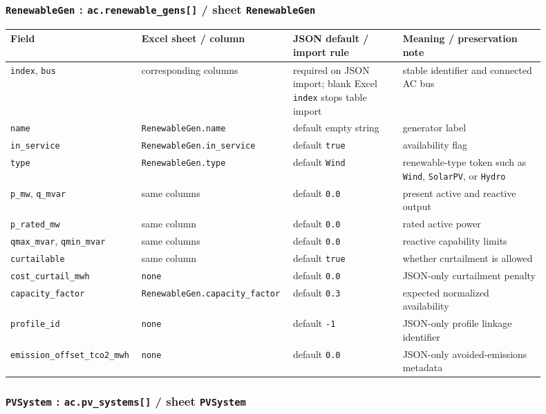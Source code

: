 \subsubsection*{\texttt{RenewableGen} : \texttt{ac.renewable\_gens[]} / sheet \texttt{RenewableGen}}

\begin{longtable}{L{0.20\linewidth}L{0.24\linewidth}L{0.20\linewidth}L{0.26\linewidth}}
\toprule
Field & Excel sheet / column & JSON default / import rule & Meaning / preservation note \\
\midrule
\endhead
\texttt{index}, \texttt{bus} & corresponding columns & required on JSON import; blank Excel \texttt{index} stops table import & stable identifier and connected AC bus \\
\texttt{name} & \texttt{RenewableGen.name} & default empty string & generator label \\
\texttt{in\_service} & \texttt{RenewableGen.in\_service} & default \texttt{true} & availability flag \\
\texttt{type} & \texttt{RenewableGen.type} & default \texttt{Wind} & renewable-type token such as \texttt{Wind}, \texttt{SolarPV}, or \texttt{Hydro} \\
\texttt{p\_mw}, \texttt{q\_mvar} & same columns & default \texttt{0.0} & present active and reactive output \\
\texttt{p\_rated\_mw} & same column & default \texttt{0.0} & rated active power \\
\texttt{qmax\_mvar}, \texttt{qmin\_mvar} & same columns & default \texttt{0.0} & reactive capability limits \\
\texttt{curtailable} & same column & default \texttt{true} & whether curtailment is allowed \\
\texttt{cost\_curtail\_mwh} & \texttt{none} & default \texttt{0.0} & JSON-only curtailment penalty \\
\texttt{capacity\_factor} & \texttt{RenewableGen.capacity\_factor} & default \texttt{0.3} & expected normalized availability \\
\texttt{profile\_id} & \texttt{none} & default \texttt{-1} & JSON-only profile linkage identifier \\
\texttt{emission\_offset\_tco2\_mwh} & \texttt{none} & default \texttt{0.0} & JSON-only avoided-emissions metadata \\
\bottomrule
\end{longtable}

\subsubsection*{\texttt{PVSystem} : \texttt{ac.pv\_systems[]} / sheet \texttt{PVSystem}}

